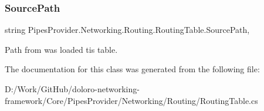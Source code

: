 \subsubsection{\texorpdfstring{Source\+Path}{SourcePath}}
{\footnotesize\ttfamily string Pipes\+Provider.\+Networking.\+Routing.\+Routing\+Table.\+Source\+Path\hspace{0.3cm}{\ttfamily [get]}, {\ttfamily [set]}}



Path from was loaded tis table. 



The documentation for this class was generated from the following file\+:\begin{DoxyCompactItemize}
\item 
D\+:/\+Work/\+Git\+Hub/doloro-\/networking-\/framework/\+Core/\+Pipes\+Provider/\+Networking/\+Routing/Routing\+Table.\+cs\end{DoxyCompactItemize}
